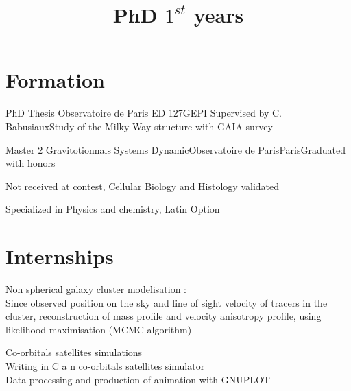 \documentclass{moderncv}
\title{PhD $1^{st}$ years}
\begin{document}
\maketitle

\section{Formation}

 {PhD Thesis} {Observatoire de Paris ED 127}{GEPI}
{Supervised by C. Babusiaux}{Study of the Milky Way structure with GAIA survey}

 {Master 2 Gravitotionnals Systems Dynamic}{Observatoire de Paris}{Paris}{}{Graduated with honors}



{Not received at contest, Cellular Biology and Histology validated}

{Specialized in Physics and chemistry, Latin Option}

\section{Internships}

{Non spherical galaxy cluster modelisation :\\
Since observed position on the sky and line of sight velocity of tracers in the cluster, reconstruction of mass profile and velocity anisotropy profile, using likelihood maximisation (MCMC algorithm)}



{Co-orbitals satellites simulations \\
  Writing in C a n co-orbitals satellites simulator
  \\Data processing and production of animation with GNUPLOT}
\end{document}
